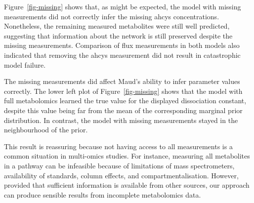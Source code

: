 \documentclass[journal=asbcd6,manuscript=article,layout=traditional]{achemso}
\begin{document}
Figure~\ref{fig-missing} shows that, as might be expected, the model
with missing measurements did not correctly infer the missing ahcys
concentrations. Nonetheless, the remaining measured metabolites were
still well predicted, suggesting that information about the network is
still preserved despite the missing measurements. Comparison of flux
measurements in both models also indicated that removing the ahcys
measurement did not result in catastrophic model failure.

The missing measurements did affect Maud's ability to infer parameter
values correctly. The lower left plot of Figure~\ref{fig-missing} shows
that the model with full metabolomics learned the true value for the
displayed dissociation constant, despite this value being far from the
mean of the corresponding marginal prior distribution. In contrast, the
model with missing measurements stayed in the neighbourhood of the
prior.

This result is reassuring because not having access to all measurements
is a common situation in multi-omics studies. For instance, measuring
all metabolites in a pathway can be infeasible because of limitations of
mass spectrometers, availability of standards, column effects, and
compartmentalisation. However, provided that sufficient information is
available from other sources, our approach can produce sensible results
from incomplete metabolomics data.
\end{document}
